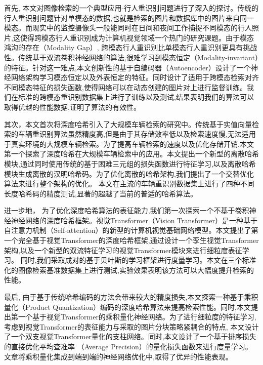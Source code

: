 首先, 本文对图像检索的一个典型应用-行人重识别问题进行了深入的探讨。传统的行人重识别问题针对单模态的数据,也就是检索的图片和数据库中的图片来自同一模态。而现实中的监控摄像头一般能同时在日间和夜间工作捕捉不同模态的行人照片,这使得跨模态行人重识别成为计算机视觉领域一个热门的研究课题。由于模态鸿沟的存在（Modality Gap）, 跨模态行人重识别比单模态行人重识别更具有挑战性。传统基于双流卷积神经网络的算法,很难学习到模态恒定（Modality-invariant）的特征。针对这一难点,本文创新性的基于自编码器（Autoencoder）设计了一个神经网络架构学习模态恒定以及外表恒定的特征。同时设计了适用于跨模态检索对齐不同模态特征的损失函数,使得网络可以在动态创建的图片对上进行监督训练。我们在标准的跨模态重识别数据集上进行了训练以及测试,结果表明我们的算法可以取得优越的性能数据,证明了算法的有效性。 \par
其次，本文首次将深度哈希引入了大规模车辆检索的研究中。传统基于实值向量检索的车辆重识别算法虽然精度高,但是由于其存储效率低以及检索速度慢,无法适用于真实环境的大规模车辆检索。为了提高车辆检索的速度以及优化存储开销,本文第一个探索了深度哈希在大规模车辆检索中的应用。本文提出一个新型的离散哈希模块,通过同时使用传统的基于困难三元组的损失函数进行特征学习,以及离散哈希模块生成离散的汉明哈希码。为了优化离散的哈希架构,我们提出了一个交替优化算法来进行整个架构的优化。 本文在主流的车辆重识别数据集上进行了四种不同长度哈希码的精度测试,显著的超越了当前的普适的哈希算法。 \par
进一步地， 为了优化深度哈希算法的表征能力,我们第一次探索一个不基于卷积神经神经网络的深度哈希框架。视觉Transformer（Vision Transformer）是一种基于自注意力机制（Self-attention）的新型的计算机视觉基础网络模型。本文提出了第一个完全基于视觉Transformer的深度哈希框架,通过设计一个孪生视觉Transformer架构,以及一个新型的双流特征学习的视觉Transformer模块来进行细粒度表征学习。 同时,我们采取成对的基于贝叶斯的学习框架进行度量学习。本文在三个标准化的图像检索基准数据集上进行测试,实验效果表明该方法可以大幅度提升检索的性能。 \par
最后, 由于基于传统哈希编码的方法会带来较大的精度损失,本文探索一种基于乘积量化（Product Quantization）编码的深度哈希算法来提高检索性能。同时,本文提出第一个基于视觉Transformer的乘积量化神经网络。为了进行细粒度的特征学习,考虑到视觉Transformer的表征能力与采取的图片分块策略紧耦合的特点, 本文设计了一个双支视觉Transformer量化的支柱网络。同时,本文设计了一个基于排序损失的直接优化平均查准率 （Average Precision）的量化损失函数来进行度量学习。文章将乘积量化集成到端到端的神经网络优化中,取得了优异的性能表现。

